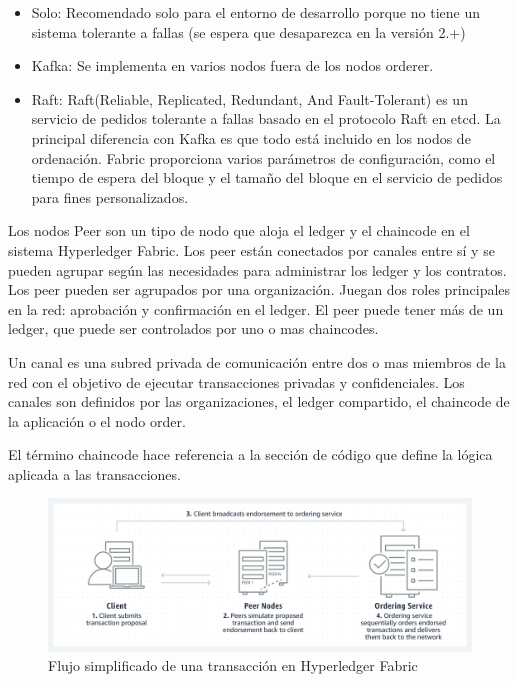 \begin{itemize}
	\item Solo: Recomendado solo para el entorno de desarrollo porque no tiene un sistema tolerante a fallas (se espera que desaparezca en la versión 2.+)
	\item Kafka: Se implementa en varios nodos fuera de los nodos orderer.
	\item Raft: Raft(Reliable, Replicated, Redundant, And Fault-Tolerant) es un servicio de pedidos tolerante a fallas basado en el protocolo Raft en etcd. La principal diferencia con Kafka es que todo está incluido en los nodos de ordenación. Fabric proporciona varios parámetros de configuración, como el tiempo de espera del bloque y el tamaño del bloque en el servicio de pedidos para fines personalizados. 
\end{itemize}

Los nodos Peer son un tipo de nodo que aloja el ledger y el chaincode en el sistema Hyperledger Fabric. Los peer están conectados por canales entre sí y se pueden agrupar según las necesidades para administrar los ledger y los contratos. Los peer pueden ser agrupados por una organización. Juegan dos roles principales en la red: aprobación y confirmación en el ledger. El peer puede tener más de un ledger, que puede ser controlados por uno o mas chaincodes.

Un canal es una subred privada de comunicación entre dos o mas miembros de la red con el objetivo de ejecutar transacciones privadas y confidenciales. Los canales son definidos por las organizaciones, el ledger compartido, el chaincode de la aplicación o el nodo order.

El término chaincode hace referencia a la sección de código que define la lógica aplicada a las transacciones.

\begin{figure}[h!]
	\includegraphics[width=\linewidth]{Graphics/hyp_fab_diagram.png}
	\caption{Flujo simplificado de una transacción en Hyperledger Fabric}
	\label{fig:3}
\end{figure}

